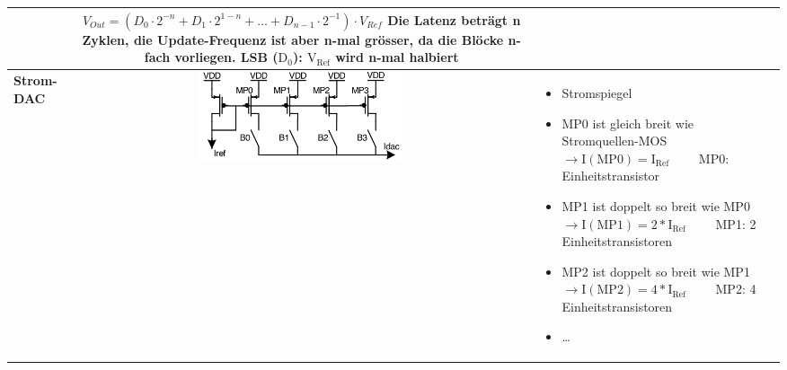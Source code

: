 \begin{longtable}{|>{\bfseries}p{4cm}|c|p{8cm}|}
	& $V_{Out} = (D_0 \cdot 2^{-n} + D_1 \cdot 2^{1-n} + ... + D_{n-1} \cdot 2^{-1})\cdot V_{Ref}$\newline\newline
      Die Latenz beträgt n Zyklen, die Update-Frequenz ist aber n-mal grösser, da die Blöcke n-fach vorliegen.\newline
      LSB ($\mathrm{D_0}$): $\mathrm{V_{Ref}}$ wird n-mal halbiert
	\\ \hline
	Strom-DAC
	& \includegraphics[width=6cm, valign=t]{images/stromDAC}
	& \begin{itemize}
  		\item Stromspiegel
  		\item MP0 ist gleich breit wie Stromquellen-MOS $\to \mathrm{I(MP0)=I_{Ref}} \qquad$ MP0: Einheitstransistor
  		\item MP1 ist doppelt so breit wie MP0 $\to \mathrm{I(MP1)}=2*\mathrm{I_{Ref}} \qquad$ MP1: 2 Einheitstransistoren
  		\item MP2 ist doppelt so breit wie MP1 $\to \mathrm{I(MP2)}=4*\mathrm{I_{Ref}} \qquad$ MP2: 4 Einheitstransistoren
  		\item \ldots
	  \end{itemize}
	\\ \hline
\end{longtable}

